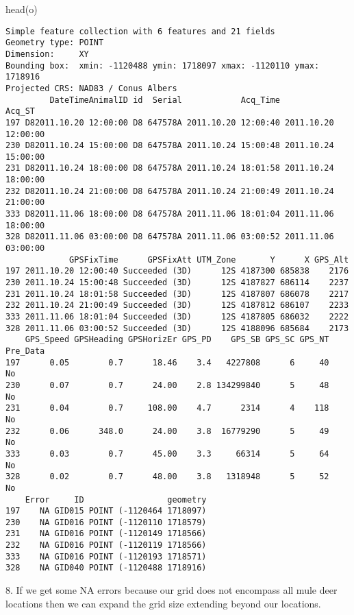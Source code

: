 \documentclass[
  letterpaper,
]{book}
\newenvironment{Shaded}{\begin{snugshade}}{\end{snugshade}}
\newcommand{\FunctionTok}[1]{\textcolor[rgb]{0.28,0.35,0.67}{#1}}
\newcommand{\NormalTok}[1]{\textcolor[rgb]{0.00,0.23,0.31}{#1}}
\begin{document}
\begin{Shaded}
\begin{Highlighting}[]
\FunctionTok{head}\NormalTok{(o)}
\end{Highlighting}
\end{Shaded}

\begin{verbatim}
Simple feature collection with 6 features and 21 fields
Geometry type: POINT
Dimension:     XY
Bounding box:  xmin: -1120488 ymin: 1718097 xmax: -1120110 ymax: 1718916
Projected CRS: NAD83 / Conus Albers
         DateTimeAnimalID id  Serial            Acq_Time              Acq_ST
197 D82011.10.20 12:00:00 D8 647578A 2011.10.20 12:00:40 2011.10.20 12:00:00
230 D82011.10.24 15:00:00 D8 647578A 2011.10.24 15:00:48 2011.10.24 15:00:00
231 D82011.10.24 18:00:00 D8 647578A 2011.10.24 18:01:58 2011.10.24 18:00:00
232 D82011.10.24 21:00:00 D8 647578A 2011.10.24 21:00:49 2011.10.24 21:00:00
333 D82011.11.06 18:00:00 D8 647578A 2011.11.06 18:01:04 2011.11.06 18:00:00
328 D82011.11.06 03:00:00 D8 647578A 2011.11.06 03:00:52 2011.11.06 03:00:00
             GPSFixTime      GPSFixAtt UTM_Zone       Y      X GPS_Alt
197 2011.10.20 12:00:40 Succeeded (3D)      12S 4187300 685838    2176
230 2011.10.24 15:00:48 Succeeded (3D)      12S 4187827 686114    2237
231 2011.10.24 18:01:58 Succeeded (3D)      12S 4187807 686078    2217
232 2011.10.24 21:00:49 Succeeded (3D)      12S 4187812 686107    2233
333 2011.11.06 18:01:04 Succeeded (3D)      12S 4187805 686032    2222
328 2011.11.06 03:00:52 Succeeded (3D)      12S 4188096 685684    2173
    GPS_Speed GPSHeading GPSHorizEr GPS_PD    GPS_SB GPS_SC GPS_NT Pre_Data
197      0.05        0.7      18.46    3.4   4227808      6     40       No
230      0.07        0.7      24.00    2.8 134299840      5     48       No
231      0.04        0.7     108.00    4.7      2314      4    118       No
232      0.06      348.0      24.00    3.8  16779290      5     49       No
333      0.03        0.7      45.00    3.3     66314      5     64       No
328      0.02        0.7      48.00    3.8   1318948      5     52       No
    Error     ID                 geometry
197    NA GID015 POINT (-1120464 1718097)
230    NA GID016 POINT (-1120110 1718579)
231    NA GID016 POINT (-1120149 1718566)
232    NA GID016 POINT (-1120119 1718566)
333    NA GID016 POINT (-1120193 1718571)
328    NA GID040 POINT (-1120488 1718916)
\end{verbatim}

8. If we get some NA errors because our grid does not encompass all mule
deer locations then we can expand the grid size extending beyond our
locations.
\end{document}
